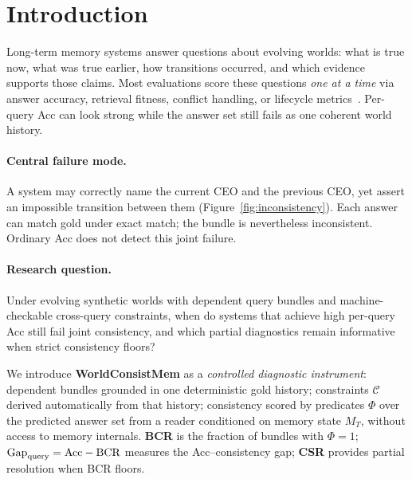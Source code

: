 \section{Introduction}
\label{sec:intro}

Long-term memory systems answer questions about evolving worlds: what is true now, what was true earlier, how transitions occurred, and which evidence supports those claims. Most evaluations score these questions \emph{one at a time} via answer accuracy, retrieval fitness, conflict handling, or lifecycle metrics~\citep{wu2025longMemEval,wu2026longMemEvalV2,hu2025memoryAgentBench,tao2026memConflict,xie2026dynamicMem,wang2026evoMemBench,hu2026everMemBench,liu2026worldMemArena}. Per-query Acc can look strong while the answer set still fails as one coherent world history.

\paragraph{Central failure mode.} A system may correctly name the current CEO and the previous CEO, yet assert an impossible transition between them (Figure~\ref{fig:inconsistency}). Each answer can match gold under exact match; the bundle is nevertheless inconsistent. Ordinary Acc does not detect this joint failure.

\paragraph{Research question.} Under evolving synthetic worlds with dependent query bundles and machine-checkable cross-query constraints, when do systems that achieve high per-query Acc still fail joint consistency, and which partial diagnostics remain informative when strict consistency floors?

We introduce \textbf{WorldConsistMem} as a \emph{controlled diagnostic instrument}: dependent bundles grounded in one deterministic gold history; constraints $\mathcal{C}$ derived automatically from that history; consistency scored by predicates $\Phi$ over the predicted answer set from a reader conditioned on memory state $M_T$, without access to memory internals. \textbf{BCR} is the fraction of bundles with $\Phi=1$; $\mathrm{Gap}_{\mathrm{query}}=\mathrm{Acc}-\mathrm{BCR}$ measures the Acc--consistency gap; \textbf{CSR} provides partial resolution when BCR floors.

